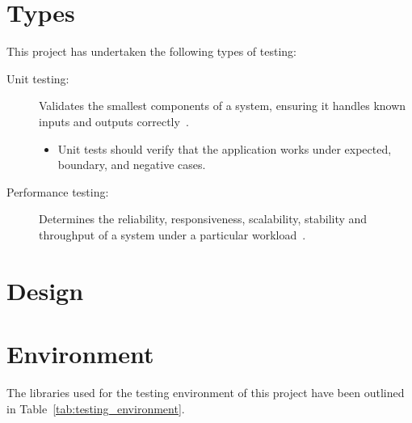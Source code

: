 \section{Types} {
\label{sec:testing_types}

	This project has undertaken the following types of testing:

	\begin{description}
		\item[Unit testing:] Validates the smallest components of a system, ensuring it handles known inputs and outputs correctly~\parencite{atlassian2015testing}.
			\begin{itemize}
				\item Unit tests should verify that the application works under expected, boundary, and negative cases.
			\end{itemize}
		\item[Performance testing:] Determines the reliability, responsiveness, scalability, stability and throughput of a system under a particular workload~\parencite{microsoft2015performance}.
	\end{description}

}

\section{Design} {
\label{sec:testing_design}




	
}

\section{Environment} {
\label{sec:testing_environment}

	The libraries used for the testing environment of this project have been outlined in Table~\ref{tab:testing_environment}.

	

}


